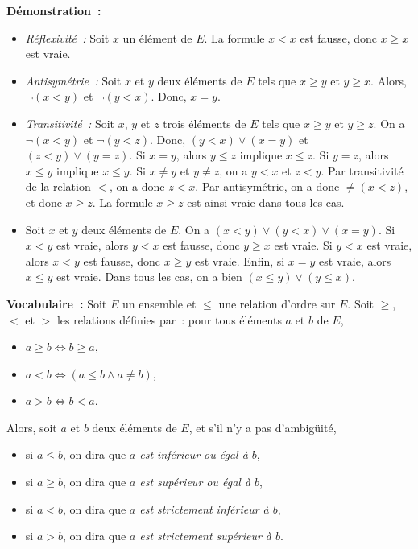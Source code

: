 \noindent\textbf{Démonstration :} 
\begin{itemize}[nosep]
    \item \textit{Réflexivité :} Soit $x$ un élément de $E$. 
        La formule $x < x$ est fausse, donc $x \geq x$ est vraie. 
    \item \textit{Antisymétrie :} Soit $x$ et $y$ deux éléments de $E$ tels que $x \geq y$ et $y \geq x$. 
        Alors, $\neg (x < y)$ et $\neg (y < x)$. 
        Donc, $x = y$.
    \item \textit{Transitivité :} Soit $x$, $y$ et $z$ trois éléments de $E$ tels que $x \geq y$ et $y \geq z$. 
        On a $\neg (x < y)$ et $\neg (y < z)$. 
        Donc, $(y < x) \vee (x = y)$ et $(z < y) \vee (y = z)$. 
        Si $x = y$, alors $y \leq z$ implique $x \leq z$.
        Si $y = z$, alors $x \leq y$ implique $x \leq y$.
        Si $x \neq y$ et $y \neq z$, on a $y < x$ et $z < y$. 
        Par transitivité de la relation $<$, on a donc $z < x$. 
        Par antisymétrie, on a donc $\neq (x < z)$, et donc $x \geq z$. 
        La formule $x \geq z$ est ainsi vraie dans tous les cas. 
    \item Soit $x$ et $y$ deux éléments de $E$. 
        On a $(x < y) \vee (y < x) \vee (x = y)$. 
        Si $x < y$ est vraie, alors $y < x$ est fausse, donc $y \geq x$ est vraie.
        Si $y < x$ est vraie, alors $x < y$ est fausse, donc $x \geq y$ est vraie.
        Enfin, si $x = y$ est vraie, alors $x \leq y$ est vraie. 
        Dans tous les cas, on a bien $(x \leq y) \vee (y \leq x)$.
\end{itemize}

\medskip

\noindent\textbf{Vocabulaire :} Soit $E$ un ensemble et $\leq$ une relation d'ordre sur $E$. 
    Soit $\geq$, $<$ et $>$ les relations définies par : pour tous éléments $a$ et $b$ de $E$, 
    \begin{itemize}[nosep]
        \item $a \geq b \Leftrightarrow b \geq a$,
        \item $a < b \Leftrightarrow ( a \leq b \wedge a \neq b )$,
        \item $a > b \Leftrightarrow b < a$.
    \end{itemize}
    Alors, soit $a$ et $b$ deux éléments de $E$, et s'il n'y a pas d'ambigüité, 
    \begin{itemize}[nosep]
        \item si $a \leq b$, on dira que \textit{$a$ est inférieur ou égal à $b$}, 
        \item si $a \geq b$, on dira que \textit{$a$ est supérieur ou égal à $b$}, 
        \item si $a < b$, on dira que \textit{$a$ est strictement inférieur à $b$}, 
        \item si $a > b$, on dira que \textit{$a$ est strictement supérieur à $b$}.
    \end{itemize}

